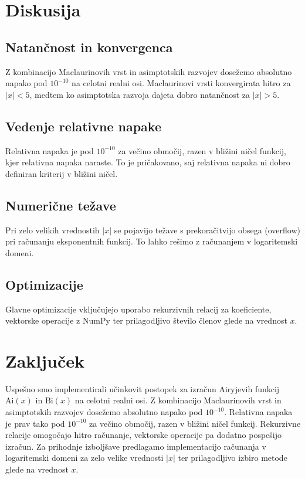 \documentclass[12pt,a4paper]{article}
\newcommand{\Ai}{\mathrm{Ai}}
\newcommand{\Bi}{\mathrm{Bi}}
\begin{document}
\section{Diskusija}

\subsection{Natančnost in konvergenca}
Z kombinacijo Maclaurinovih vrst in asimptotskih razvojev dosežemo absolutno napako pod $10^{-10}$ na celotni realni osi. Maclaurinovi vrsti konvergirata hitro za $|x| < 5$, medtem ko asimptotska razvoja dajeta dobro natančnost za $|x| > 5$.

\subsection{Vedenje relativne napake}
Relativna napaka je pod $10^{-10}$ za večino območij, razen v bližini ničel funkcij, kjer relativna napaka naraste. To je pričakovano, saj relativna napaka ni dobro definiran kriterij v bližini ničel.

\subsection{Numerične težave}
Pri zelo velikih vrednostih $|x|$ se pojavijo težave s prekoračitvijo obsega (overflow) pri računanju eksponentnih funkcij. To lahko rešimo z računanjem v logaritemski domeni.

\subsection{Optimizacije}
Glavne optimizacije vključujejo uporabo rekurzivnih relacij za koeficiente, vektorske operacije z NumPy ter prilagodljivo število členov glede na vrednost $x$.

\section{Zaključek}

Uspešno smo implementirali učinkovit postopek za izračun Airyjevih funkcij $\Ai(x)$ in $\Bi(x)$ na celotni realni osi. Z kombinacijo Maclaurinovih vrst in asimptotskih razvojev dosežemo absolutno napako pod $10^{-10}$. Relativna napaka je prav tako pod $10^{-10}$ za večino območij, razen v bližini ničel funkcij. Rekurzivne relacije omogočajo hitro računanje, vektorske operacije pa dodatno pospešijo izračun. Za prihodnje izboljšave predlagamo implementacijo računanja v logaritemski domeni za zelo velike vrednosti $|x|$ ter prilagodljivo izbiro metode glede na vrednost $x$.
\end{document}
